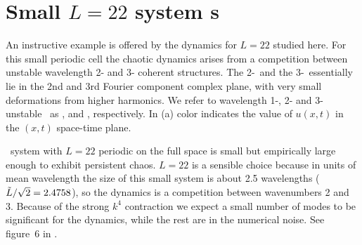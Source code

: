 %


\section{Small $L=22$ system {\rpo s}}
\label{s:L22}

An instructive 
example is offered by the dynamics for $L=22$ studied here.
For this small periodic cell
the chaotic dynamics arises from
a competition between unstable
wavelength 2- and 3- coherent structures.
The 2-\eqv\  and the 3-\eqv\  essentially lie in
the 2nd and 3rd Fourier component complex plane, with very
small deformations from higher harmonics.
We refer to wavelength 1-, 2- and 3- unstable \eqva\ as
,  and ,
respectively.
In (a)
color indicates the value of $u(x,t)$ in 
the $(x,t)$ space-time plane.

\KS\ system with $L = 22$ periodic on the full space is small but
empirically large enough to exhibit persistent chaos.  $L=22$ is a
sensible choice because in units of mean wavelength the size of this
small system is about 2.5 wavelengths ($\tilde{L}/\sqrt{2}= 2.4758$),
so the dynamics is a competition between wavenumbers 2 and 3.
Because of the strong $k^4$ contraction we expect a small
number of modes to be significant for the dynamics, while the
rest are in the numerical noise. See figure~6 in
.


\subsection{\Eqva}

